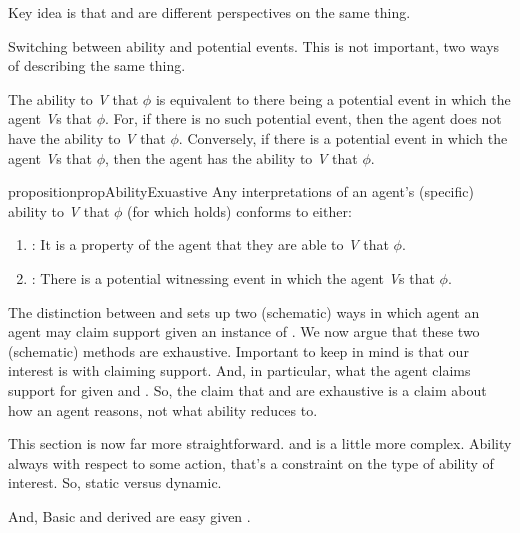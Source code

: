 \begin{note}
  Key idea is that \AR{} and \WR{} are different perspectives on the same thing.

  Switching between ability and potential events.
  This is not important, two ways of describing the same thing.

  The ability to \emph{V} that \(\phi\) is equivalent to there being a potential event in which the agent \emph{V}s that \(\phi\).
  For, if there is no such potential event, then the agent does not have the ability to \emph{V} that \(\phi\).
  Conversely, if there is a potential event in which the agent \emph{V}s that \(\phi\), then the agent has the ability to \emph{V} that \(\phi\).
\end{note}

\begin{note}[Exhaustive]
    \begin{restatable}[]{proposition}{propAbilityExuastive}\label{prop:WR-and-AR-exhaustive}\label{either-AR-or-WR}
    Any interpretations of an agent's (specific) ability to \emph{V} that \(\phi\) (for which  holds) conforms to either:
    \begin{enumerate}
    \item \AR{}: It is a property of the agent that they are able to \emph{V} that \(\phi\).
    \item \WR{}: There is a potential witnessing event in which the agent \emph{V}s that \(\phi\).
    \end{enumerate}
    \vspace{-\baselineskip}
  \end{restatable}
\end{note}

\begin{note}
  The distinction between \AR{} and \WR{} sets up two (schematic) ways in which agent an agent may claim support given an instance of .
  We now argue that these two (schematic) methods are exhaustive.
  {
    \color{red}
    Important to keep in mind is that our interest is with claiming support.
    And, in particular, what the agent claims support for given \AR{} and \WR{}.
    So, the claim that \AR{} and \WR{} are exhaustive is a claim about how an agent reasons, not what ability reduces to.
  }
\end{note}

\begin{note}
  \color{red}
  This section is now far more straightforward.
  \AR{} and \WR{} is a little more complex.
  Ability always with respect to some action, that's a constraint on the type of ability of interest.
  So, static versus dynamic.


  And, Basic and derived are easy given \AR{}.
\end{note}


